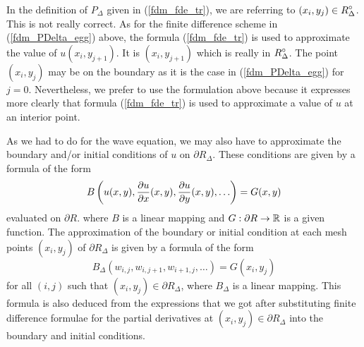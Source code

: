 In the definition of $P_\Delta$ given in (\ref{fdm_fde_tr}), we are
referring to $\displaystyle (x_i,y_j) \in R^\circ_\Delta$.  This is
not really correct.
As for the finite difference scheme in (\ref{fdm_PDelta_egg}) above,
the formula (\ref{fdm_fde_tr}) is used to approximate the value of
$u(x_i,y_{j+1})$.  It is $(x_i,y_{j+1})$ which is really in
$\displaystyle R^\circ_\Delta$.   The point $(x_i,y_j)$ may be on the boundary as
it is the case in (\ref{fdm_PDelta_egg}) for $j=0$.  Nevertheless,
we prefer to use the formulation above because it expresses more
clearly that formula (\ref{fdm_fde_tr}) is used to approximate a value
of $u$ at an interior point.

As we had to do for the wave equation, we may also have to approximate
the boundary and/or initial conditions of $u$ on $\partial R_\Delta$.
These conditions are given by a formula of the form 
\begin{equation}\label{fdm_pde_tr_bdry}
  B\left(u(x,y), \frac{\partial{u}}{\partial{x}}(x,y), \frac{\partial{u}}{\partial{y}}(x,y), \ldots \right) = G(x,y)
\end{equation}
evaluated on $\partial R$. where $B$ is a linear mapping and
$G:\partial R \to \mathbb{R}$ is a given function.
The approximation of the boundary or initial condition at each mesh
points $(x_i,y_j)$ of $\partial R_\Delta$ is given by
a formula of the form
\begin{equation}\label{fdm_fde_tr_bdry}
  B_\Delta(w_{i,j},w_{i,j+1},w_{i+1,j}, \ldots) = G(x_i,y_j)
\end{equation}
for all $(i,j)$ such that $(x_i,y_j) \in \partial R_\Delta$,
where $B_\Delta$ is a linear mapping.  This formula is also
deduced from the expressions that we got after substituting finite
difference formulae for the partial derivatives at
$(x_i,y_j)\in \partial R_\Delta$ into the boundary and initial conditions.

